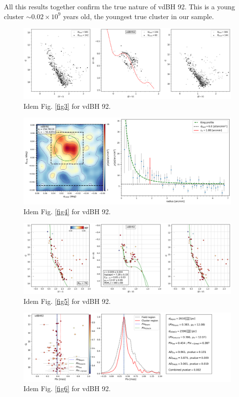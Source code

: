 \documentclass[draft]{aa}
\begin{document}
All this results together confirm the true nature of vdBH 92. This is a
young cluster $\sim0.02\times10^9$ years old, the youngest true cluster in our
sample.

\begin{figure}[ht]
    \centering
    \includegraphics[width=\hsize]{../figs/obs_vdBH92.png}
    \caption{Idem Fig. \ref{fig3} for vdBH 92.}
    \label{fig35}
\end{figure}
\begin{figure}[ht]
    \centering
    \includegraphics[width=\hsize]{../figs/dmap_vdbh92.png}
    \caption{Idem Fig. \ref{fig4} for vdBH 92.}
    \label{fig36}
\end{figure}
\begin{figure}[ht]
    \centering
    \includegraphics[width=\hsize]{../figs/cmds_vdbh92.png}
    \caption{Idem Fig. \ref{fig5} for vdBH 92.}
    \label{fig37}
\end{figure}
\begin{figure}[ht]
    \centering
    \includegraphics[width=\hsize]{../figs/plx_vdBH92.png}
    \caption{Idem Fig. \ref{fig6} for vdBH 92.}
    \label{fig38}
\end{figure}
\end{document}
